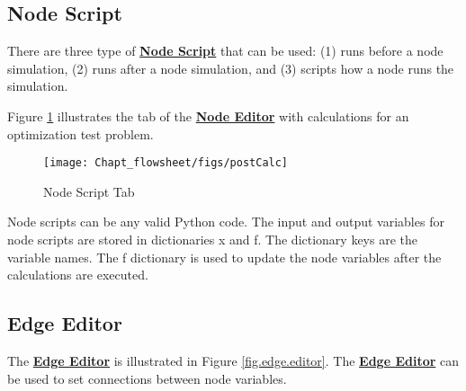 \subsection{Node Script}

There are three type of \textbf{\underline{Node Script}} that can be used: (1)  runs before a node simulation, (2)  runs after a node simulation, and (3)  scripts how a node runs the simulation.

Figure \ref{fig.post.calc} illustrates the  tab of the \textbf{\underline{Node Editor}} with calculations for an optimization test problem.

\begin{figure}[H]
	\begin{center}
		\texttt{[image: Chapt\_flowsheet/figs/postCalc]}
		\caption{Node Script Tab}
		\label{fig.post.calc}
	\end{center}
\end{figure}

Node scripts can be any valid Python code. The input and output variables for node scripts are stored in dictionaries x and f. The dictionary keys are the variable names. The f dictionary is used to update the node variables after the calculations are executed.

\subsection{Edge Editor}
The \textbf{\underline{Edge Editor}} is illustrated in Figure \ref{fig.edge.editor}.  The \textbf{\underline{Edge Editor}} can be used to set connections between node variables.

